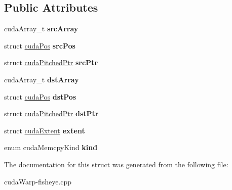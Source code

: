 \subsection*{Public Attributes}
\begin{DoxyCompactItemize}
\item 
cuda\+Array\+\_\+t {\bfseries src\+Array}\hypertarget{structcudaMemcpy3DParms_a22fb6a1c28fe0d6d96772c994a963f1f}{}\label{structcudaMemcpy3DParms_a22fb6a1c28fe0d6d96772c994a963f1f}

\item 
struct \hyperlink{structcudaPos}{cuda\+Pos} {\bfseries src\+Pos}\hypertarget{structcudaMemcpy3DParms_a36e02256b567dca1b3099d7a6a3b6d4b}{}\label{structcudaMemcpy3DParms_a36e02256b567dca1b3099d7a6a3b6d4b}

\item 
struct \hyperlink{structcudaPitchedPtr}{cuda\+Pitched\+Ptr} {\bfseries src\+Ptr}\hypertarget{structcudaMemcpy3DParms_a2c0214914f84710757a07cc679b01397}{}\label{structcudaMemcpy3DParms_a2c0214914f84710757a07cc679b01397}

\item 
cuda\+Array\+\_\+t {\bfseries dst\+Array}\hypertarget{structcudaMemcpy3DParms_a7d77d9ecb416b7f4ba4ee8d354b9d6fd}{}\label{structcudaMemcpy3DParms_a7d77d9ecb416b7f4ba4ee8d354b9d6fd}

\item 
struct \hyperlink{structcudaPos}{cuda\+Pos} {\bfseries dst\+Pos}\hypertarget{structcudaMemcpy3DParms_a62d0ce8f8030683a365c9fc58b0b4d45}{}\label{structcudaMemcpy3DParms_a62d0ce8f8030683a365c9fc58b0b4d45}

\item 
struct \hyperlink{structcudaPitchedPtr}{cuda\+Pitched\+Ptr} {\bfseries dst\+Ptr}\hypertarget{structcudaMemcpy3DParms_a5541621b6b654ecae4d5cab526ddd70e}{}\label{structcudaMemcpy3DParms_a5541621b6b654ecae4d5cab526ddd70e}

\item 
struct \hyperlink{structcudaExtent}{cuda\+Extent} {\bfseries extent}\hypertarget{structcudaMemcpy3DParms_a1a54c24021add984df530442dd65ec1c}{}\label{structcudaMemcpy3DParms_a1a54c24021add984df530442dd65ec1c}

\item 
enum cuda\+Memcpy\+Kind {\bfseries kind}\hypertarget{structcudaMemcpy3DParms_a0caa37ba0134b351170924565d07be20}{}\label{structcudaMemcpy3DParms_a0caa37ba0134b351170924565d07be20}

\end{DoxyCompactItemize}


The documentation for this struct was generated from the following file\+:\begin{DoxyCompactItemize}
\item 
cuda\+Warp-\/fisheye.\+cpp\end{DoxyCompactItemize}
